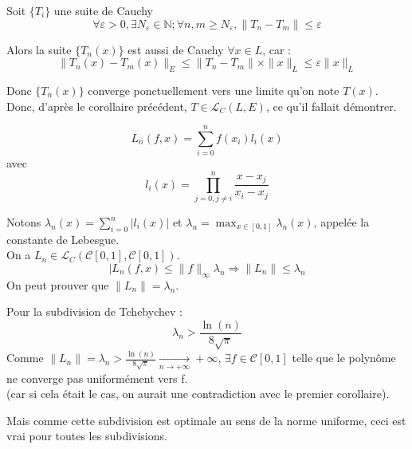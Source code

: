 \begin{dem}
Soit $\{T_i\}$ une suite de Cauchy
\[\forall \varepsilon>0, \exists N_{\varepsilon}\in\mathbb{N}; \forall n,m\geq N_{\varepsilon}, \|T_n-T_m\|\leq \varepsilon\]

Alors la suite $\{T_n(x)\}$ est aussi de Cauchy $\forall x\in L$, car :
\[\|T_n(x)-T_m(x)\|_E\leq \|T_n-T_m\|\times \|x\|_L\leq \varepsilon \|x\|_L\]

Donc $\{T_n(x)\}$ converge ponctuellement vers une limite qu'on note $T(x)$. Donc, d'après le corollaire précédent, $T\in \mathcal{L}_C(L,E)$, ce qu'il fallait démontrer.
\end{dem}


\begin{dem}
\[L_n(f,x)=\sum_{i=0}^n f(x_i)l_i(x)\]
avec \[l_i(x)=\prod_{j=0,j\neq i}^n \frac{x-x_j}{x_i-x_j}\]

Notons $\lambda_n(x)=\sum_{i=0}^n |l_i(x)|$ et $\lambda_n=\max_{x\in[0,1]} \lambda_n(x)$, appelée la constante de Lebesgue.\\
On a $L_n\in\mathcal{L}_C(\mathcal{C}[0,1],\mathcal{C}[0,1])$.
\[|L_n(f,x)\leq \|f\|_{\infty} \lambda_n\Rightarrow \|L_n\|\leq \lambda_n\]
On peut prouver que $\|L_n\|=\lambda_n$.

\bigskip
Pour la subdivision de Tchebychev :
\[\lambda_n > \frac{\ln(n)}{8\sqrt{\pi}}\]
Comme $\|L_n\|=\lambda_n>\frac{\ln(n)}{8\sqrt{\pi}}\xrightarrow[n\to+\infty]{}+\infty$, $\exists f\in\mathcal{C}[0,1]$ telle que le polynôme ne converge pas uniformément vers f.\\
(car si cela était le cas, on aurait une contradiction avec le premier corollaire).

\bigskip
Mais comme cette subdivision est optimale au sens de la norme uniforme, ceci est vrai pour toutes les subdivisions.
\end{dem}

\newpage
